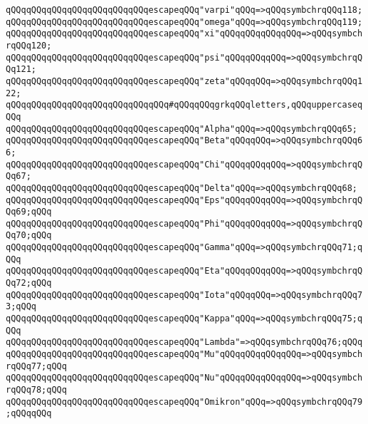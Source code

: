 \verb|qQQqqQQqqQQqqQQqqQQqqQQqqQQqescapeqQQq"varpi"qQQq=>qQQqsymbchrqQQq118;|\newline
\verb|qQQqqQQqqQQqqQQqqQQqqQQqqQQqescapeqQQq"omega"qQQq=>qQQqsymbchrqQQq119;|\newline
\verb|qQQqqQQqqQQqqQQqqQQqqQQqqQQqescapeqQQq"xi"qQQqqQQqqQQqqQQq=>qQQqsymbchrqQQq120;|\newline
\verb|qQQqqQQqqQQqqQQqqQQqqQQqqQQqescapeqQQq"psi"qQQqqQQqqQQq=>qQQqsymbchrqQQq121;|\newline
\verb|qQQqqQQqqQQqqQQqqQQqqQQqqQQqescapeqQQq"zeta"qQQqqQQq=>qQQqsymbchrqQQq122;|\newline
\newline
\verb|qQQqqQQqqQQqqQQqqQQqqQQqqQQqqQQq#qQQqqQQqgrkqQQqletters,qQQquppercaseqQQq|\newline
\verb|qQQqqQQqqQQqqQQqqQQqqQQqqQQqescapeqQQq"Alpha"qQQq=>qQQqsymbchrqQQq65;|\newline
\verb|qQQqqQQqqQQqqQQqqQQqqQQqqQQqescapeqQQq"Beta"qQQqqQQq=>qQQqsymbchrqQQq66;|\newline
\verb|qQQqqQQqqQQqqQQqqQQqqQQqqQQqescapeqQQq"Chi"qQQqqQQqqQQq=>qQQqsymbchrqQQq67;|\newline
\verb|qQQqqQQqqQQqqQQqqQQqqQQqqQQqescapeqQQq"Delta"qQQq=>qQQqsymbchrqQQq68;|\newline
\verb|qQQqqQQqqQQqqQQqqQQqqQQqqQQqescapeqQQq"Eps"qQQqqQQqqQQq=>qQQqsymbchrqQQq69;qQQq|\newline
\verb|qQQqqQQqqQQqqQQqqQQqqQQqqQQqescapeqQQq"Phi"qQQqqQQqqQQq=>qQQqsymbchrqQQq70;qQQq|\newline
\verb|qQQqqQQqqQQqqQQqqQQqqQQqqQQqescapeqQQq"Gamma"qQQq=>qQQqsymbchrqQQq71;qQQq|\newline
\verb|qQQqqQQqqQQqqQQqqQQqqQQqqQQqescapeqQQq"Eta"qQQqqQQqqQQq=>qQQqsymbchrqQQq72;qQQq|\newline
\verb|qQQqqQQqqQQqqQQqqQQqqQQqqQQqescapeqQQq"Iota"qQQqqQQq=>qQQqsymbchrqQQq73;qQQq|\newline
\verb|qQQqqQQqqQQqqQQqqQQqqQQqqQQqescapeqQQq"Kappa"qQQq=>qQQqsymbchrqQQq75;qQQq|\newline
\verb|qQQqqQQqqQQqqQQqqQQqqQQqqQQqescapeqQQq"Lambda"=>qQQqsymbchrqQQq76;qQQq|\newline
\verb|qQQqqQQqqQQqqQQqqQQqqQQqqQQqescapeqQQq"Mu"qQQqqQQqqQQqqQQq=>qQQqsymbchrqQQq77;qQQq|\newline
\verb|qQQqqQQqqQQqqQQqqQQqqQQqqQQqescapeqQQq"Nu"qQQqqQQqqQQqqQQq=>qQQqsymbchrqQQq78;qQQq|\newline
\verb|qQQqqQQqqQQqqQQqqQQqqQQqqQQqescapeqQQq"Omikron"qQQq=>qQQqsymbchrqQQq79;qQQqqQQq|\newline
